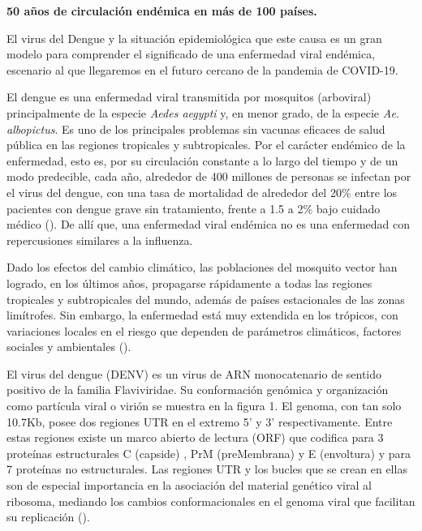 \documentclass[
  12pt, krantz2,
  spanish,
]{krantz}
\begin{document}
\textbf{50 años de circulación endémica en más de 100 países.}

El virus del Dengue y la situación epidemiológica que este causa es un gran modelo para comprender el significado de una enfermedad viral endémica, escenario al que llegaremos en el futuro cercano de la pandemia de COVID-19.

El dengue es una enfermedad viral transmitida por mosquitos (arboviral) principalmente de la especie \emph{Aedes aegypti} y, en menor grado, de la especie \emph{Ae. albopictus}. Es uno de los principales problemas sin vacunas eficaces de salud pública en las regiones tropicales y subtropicales. Por el carácter endémico de la enfermedad, esto es, por su circulación constante a lo largo del tiempo y de un modo predecible, cada año, alrededor de 400 millones de personas se infectan por el virus del dengue, con una tasa de mortalidad de alrededor del 20\% entre los pacientes con dengue grave sin tratamiento, frente a 1.5 a 2\% bajo cuidado médico (\citet{luang2018hyperendemic}). De allí que, una enfermedad viral endémica no es una enfermedad con repercusiones similares a la influenza.

Dado los efectos del cambio climático, las poblaciones del mosquito vector han logrado, en los últimos años, propagarse rápidamente a todas las regiones tropicales y subtropicales del mundo, además de países estacionales de las zonas limítrofes. Sin embargo, la enfermedad está muy extendida en los trópicos, con variaciones locales en el riesgo que dependen de parámetros climáticos, factores sociales y ambientales (\citet{luang2018hyperendemic}).

El virus del dengue (DENV) es un virus de ARN monocatenario de sentido positivo de la familia Flaviviridae. Su conformación genómica y organización como partícula viral o virión se muestra en la figura 1. El genoma, con tan solo 10.7Kb, posee dos regiones UTR en el extremo 5' y 3' respectivamente. Entre estas regiones existe un marco abierto de lectura (ORF) que codifica para 3 proteínas estructurales C (capside) , PrM (preMembrana) y E (envoltura) y para 7 proteínas no estructurales. Las regiones UTR y los bucles que se crean en ellas son de especial importancia en la asociación del material genético viral al ribosoma, mediando los cambios conformacionales en el genoma viral que facilitan su replicación (\citet{nanaware2021dengue}).
\end{document}
